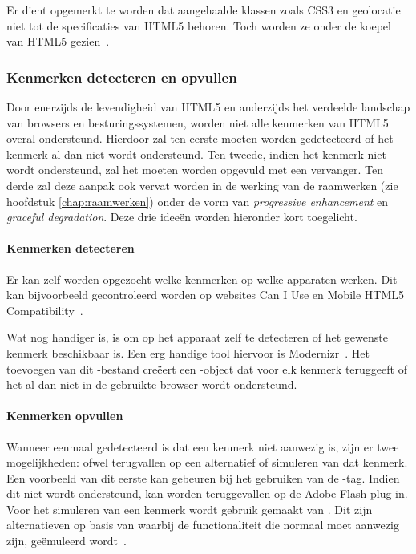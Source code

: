 Er dient opgemerkt te worden dat aangehaalde klassen zoals CSS3 en geolocatie niet tot de specificaties van HTML5 behoren. 
Toch worden ze onder de koepel van HTML5 gezien~\cite{MacDonald2011}.

\subsubsection{Kenmerken detecteren en opvullen}
Door enerzijds de levendigheid van HTML5 en anderzijds het verdeelde landschap van browsers en besturingssystemen, worden niet alle kenmerken van HTML5 overal ondersteund. 
Hierdoor zal ten eerste moeten worden gedetecteerd of het kenmerk al dan niet wordt ondersteund.
Ten tweede, indien het kenmerk niet wordt ondersteund, zal het moeten worden opgevuld met een vervanger.
Ten derde zal deze aanpak ook vervat worden in de werking van de raamwerken (zie hoofdstuk \ref{chap:raamwerken}) onder de vorm van \emph{progressive enhancement} en \emph{graceful degradation}.
Deze drie ideeën worden hieronder kort toegelicht.

\paragraph{Kenmerken detecteren}
Er kan zelf worden opgezocht welke kenmerken op welke apparaten werken. 
Dit kan bijvoorbeeld gecontroleerd worden op websites Can I Use en Mobile HTML5 Compatibility~\cite{Deveria2013c,Firtman2013a,MacDonald2011}. 

Wat nog handiger is, is om op het apparaat zelf te detecteren of het gewenste kenmerk beschikbaar is. 
Een erg handige tool hiervoor is Modernizr~\cite{Modernizr2012}. 
Het toevoegen van dit \js{}-bestand creëert een \js{}-object dat voor elk kenmerk teruggeeft of het al dan niet in de gebruikte browser wordt ondersteund.

\paragraph{Kenmerken opvullen}
Wanneer eenmaal gedetecteerd is dat een kenmerk niet aanwezig is, zijn er twee mogelijkheden: ofwel terugvallen op een alternatief of simuleren van dat kenmerk. 
Een voorbeeld van dit eerste kan gebeuren bij het gebruiken van de -tag. 
Indien dit niet wordt ondersteund, kan worden teruggevallen op de Adobe Flash plug-in. 
Voor het simuleren van een kenmerk wordt gebruik gemaakt van . 
Dit zijn alternatieven op basis van \js{} waarbij de  functionaliteit die normaal moet aanwezig zijn, geëmuleerd wordt~\cite{MacDonald2011,Weyl2011}.

